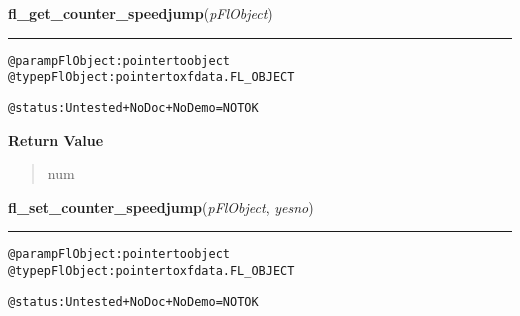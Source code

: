     \label{xformslib:flcounter:fl_get_counter_speedjump}

    \vspace{0.5ex}

\hspace{.8\funcindent}\begin{boxedminipage}{\funcwidth}

    \raggedright \textbf{fl\_get\_counter\_speedjump}(\textit{pFlObject})

    \vspace{-1.5ex}

    \rule{\textwidth}{0.5\fboxrule}
\setlength{\parskip}{2ex}
\begin{alltt}
@param pFlObject: pointer to object
@type pFlObject: pointer to xfdata.FL\_OBJECT

        @status: Untested + NoDoc + NoDemo = NOT OK
    
\end{alltt}

\setlength{\parskip}{1ex}
      \textbf{Return Value}
    \vspace{-1ex}

      \begin{quote}
      num

      \end{quote}

    \end{boxedminipage}

    \label{xformslib:flcounter:fl_set_counter_speedjump}

    \vspace{0.5ex}

\hspace{.8\funcindent}\begin{boxedminipage}{\funcwidth}

    \raggedright \textbf{fl\_set\_counter\_speedjump}(\textit{pFlObject}, \textit{yesno})

    \vspace{-1.5ex}

    \rule{\textwidth}{0.5\fboxrule}
\setlength{\parskip}{2ex}
\begin{alltt}
        @param pFlObject: pointer to object
@type pFlObject: pointer to xfdata.FL\_OBJECT

        @status: Untested + NoDoc + NoDemo = NOT OK
    
\end{alltt}

\setlength{\parskip}{1ex}
    \end{boxedminipage}


